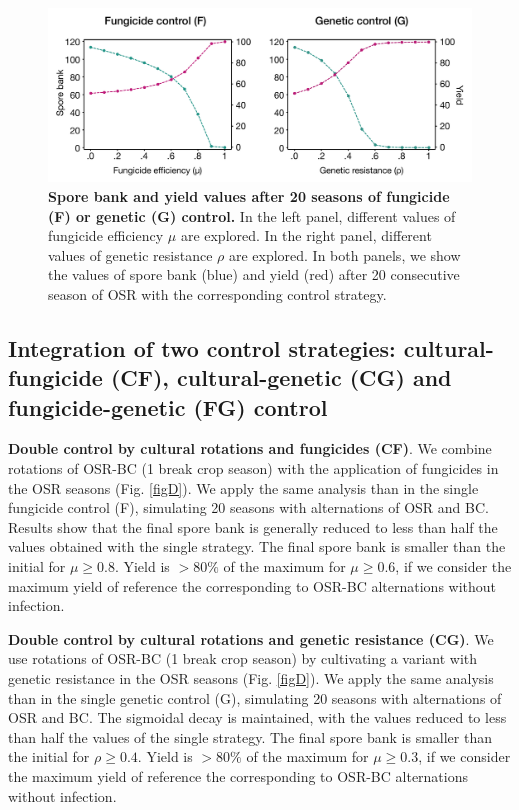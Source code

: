 \documentclass{article}
\begin{document}
 \begin{figure}
 \includegraphics[width=\columnwidth]{SCL_Fig/SCL_FigC.pdf}
\caption{\label{fig:figC}\textbf{Spore bank and yield values after 20 seasons of fungicide (F) or genetic (G) control.} In the left panel, different values of fungicide efficiency $\mu$ are explored. In the right panel, different values of genetic resistance $\rho$ are explored. In both panels, we show the values of spore bank (blue) and yield (red) after 20 consecutive season of OSR with the corresponding control strategy. }
\end{figure}
 
\subsection{Integration of two control strategies: cultural-fungicide (CF), cultural-genetic (CG) and fungicide-genetic (FG) control} 

\textbf{Double control by cultural rotations and fungicides (CF)}. We combine rotations of OSR-BC (1 break crop season) with the application of fungicides in the OSR seasons  (Fig. \ref{figD}). We apply the same analysis than in the single fungicide control (F), simulating 20 seasons with alternations of OSR and BC. Results show that the final spore bank is generally reduced to less than half the values obtained with the single strategy. The final spore bank is smaller than the initial for $\mu \geq 0.8$. Yield is $>80\%$ of the maximum for $\mu \geq 0.6$, if we consider the maximum yield of reference the corresponding to OSR-BC alternations without infection. 
 
 \textbf{Double control by cultural rotations and genetic resistance (CG)}. We use rotations of OSR-BC (1 break crop season) by cultivating a variant with genetic resistance in the OSR seasons (Fig. \ref{figD}). We apply the same analysis than in the single genetic control (G), simulating 20 seasons with alternations of OSR and BC. The sigmoidal decay is maintained, with the values reduced to less than half the values of the single strategy. The final spore bank is smaller than the initial for $\rho \geq 0.4$. Yield is $>80\%$ of the maximum for $\mu \geq 0.3$, if we consider the maximum yield of reference the corresponding to OSR-BC alternations without infection. 
\end{document}
